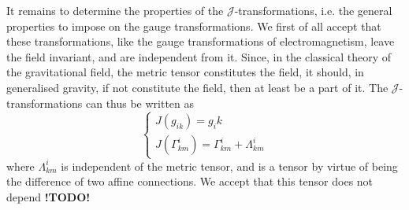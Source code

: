 \documentclass{article}
\theoremstyle{plain}
\theoremstyle{definition}
\newcommand{\JJ}{\mathcal{J}}
\newcommand{\todo}{\textbf{ !TODO! }}
\begin{document}
It remains to determine the properties of the $\JJ$-transformations, i.e. the general properties to impose on the gauge transformations.
We first of all accept that these transformations, like the gauge transformations of electromagnetism, leave the field invariant, and are independent from it.
Since, in the classical theory of the gravitational field, the metric tensor constitutes the field, it should, in generalised gravity, if not constitute the field, then at least be a part of it.
The $\JJ$-transformations can thus be written as
\[
\label{equation3}
  \begin{cases}
    J(g_{ik}) = g_ik
  \\J(\Gamma_{km}^i) = \Gamma_{km}^i+\Lambda_{km}^i
  \end{cases}
  \tag{3}
\]
where $\Lambda_{km}^i$ is independent of the metric tensor, and is a tensor by virtue of being the difference of two affine connections.
We accept that this tensor does not depend \todo
\end{document}
